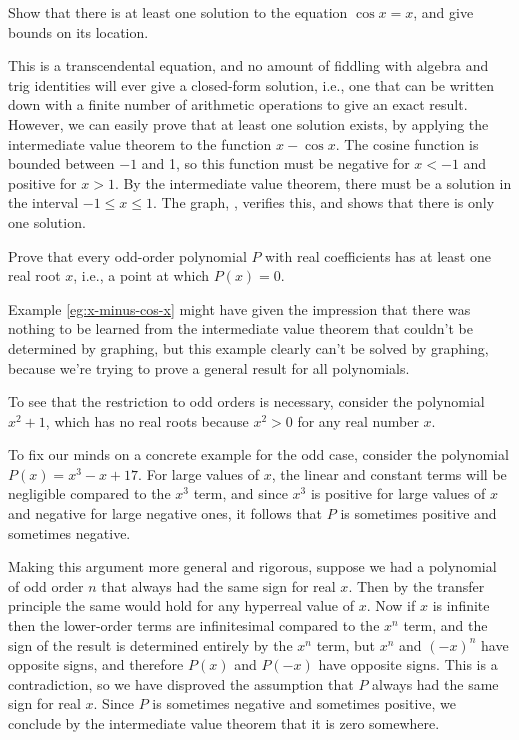 \begin{eg}\label{eg:x-minus-cos-x}
\egquestion Show that there is at least one solution to the equation $\cos x=x$, and give bounds on its location.

\eganswer This is a transcendental equation, and no amount of fiddling with algebra and trig identities will
ever give a closed-form solution, i.e., one that can be written down with a finite number of arithmetic
operations to give an exact result. However, we can easily prove that at least one solution exists, by
applying the intermediate value theorem to the function $x-\cos x$. The cosine function is bounded between
$-1$ and 1, so this function must be negative for $x<-1$ and positive for $x>1$. By the intermediate value
theorem, there must be a solution in the interval $-1 \le x \le 1$. The graph, , verifies
this, and shows that there is only one solution.
\end{eg}




\begin{eg}
\egquestion Prove that every odd-order polynomial $P$ with real coefficients has at least one real root $x$, i.e., a
point at which $P(x)=0$.

\eganswer
Example \ref{eg:x-minus-cos-x} might have given the impression that there was nothing
to be learned from the intermediate value theorem that couldn't be determined by graphing,
but this example clearly can't be solved by graphing, because we're trying to prove
a general result for all polynomials.

To see that the restriction to odd orders is necessary, consider the polynomial $x^2+1$, which has no real roots
because $x^2>0$ for any real number $x$.

To fix our minds on a concrete example for the odd case, consider the polynomial $P(x)=x^3-x+17$.
For large values of $x$, the linear and constant terms will be negligible compared to the $x^3$ term,
and since $x^3$ is positive for large values of $x$ and negative for large negative ones, it follows
that $P$ is sometimes positive and sometimes negative.

Making this argument more general and rigorous,
suppose we had a polynomial of odd order $n$ that always had the same sign for real $x$. Then by the transfer principle
the same would hold for any hyperreal value of $x$. Now if $x$ is infinite then the lower-order terms
are infinitesimal compared to the $x^n$ term, and the sign of the result is determined entirely by the
$x^n$ term, but $x^n$ and $(-x)^n$ have opposite signs, and therefore $P(x)$ and $P(-x)$ have opposite signs.
This is a contradiction, so we have disproved the assumption that $P$ always had the same sign for real $x$.
Since $P$ is sometimes negative and sometimes positive, we conclude by the intermediate value theorem that
it is zero somewhere.
\end{eg}

